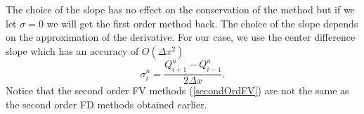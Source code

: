 The choice of the slope has no effect on the conservation of the method but if we let $\sigma = 0$ we will get the first order method back. The choice of the slope depends on the approximation of the derivative. For our case, we use the center difference slope which has an accuracy of $O(\Delta x^2)$
%
\begin{equation*}
\sigma_i^n = \frac{Q_{i+1}^n-Q_{i-1}^n}{2 \Delta x}.
\end{equation*}
%
Notice that the second order FV methods (\ref{secondOrdFV}) are not the same as the second order FD methods obtained earlier.
